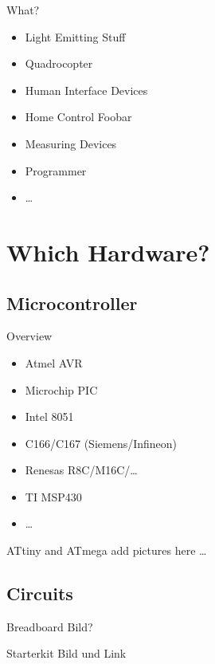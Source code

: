 \documentclass{beamer}
\begin{document}
\begin{frame}{What?}
    \begin{itemize}
        \item Light Emitting Stuff
        \item Quadrocopter
        \item Human Interface Devices
        \item Home Control Foobar
        \item Measuring Devices
        \item Programmer
        \item \dots
    \end{itemize}
\end{frame}

\section{Which Hardware?}

\subsection{Microcontroller}

\begin{frame}{Overview}
    \begin{itemize}
        \item Atmel AVR
        \item Microchip PIC
        \item Intel 8051
        \item C166/C167 (Siemens/Infineon)
        \item Renesas R8C/M16C/…
        \item TI MSP430
        \item …
    \end{itemize}
\end{frame}

\begin{frame}{ATtiny and ATmega}
    add pictures here \dots
\end{frame}

\subsection{Circuits}

\begin{frame}{Breadboard}
    Bild?
\end{frame}

\begin{frame}{Starterkit}
    Bild und Link
\end{frame}
\end{document}
